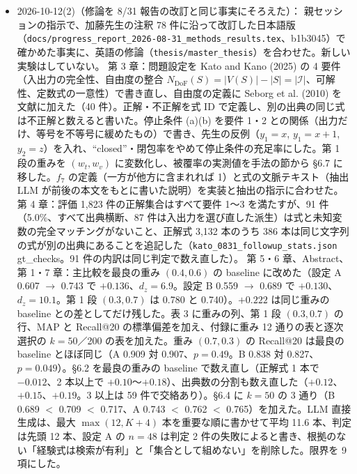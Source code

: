 \documentclass[11pt,a4paper]{jsarticle}
\begin{document}
\begin{itemize}[nosep]
    表 3 の提案手法の MAP を \texttt{kato\_0831\_followup\_stats.json} map\_standard の値に改めた（設定 A：重み $(0.7, 0.3)$ 0.796、$(0.3, 0.7)$ 0.850。設定 B：0.715、0.795）。\S 6.1 は「MAP でも最良の baseline を 10 分割すべてで上回る（A $+0.104$、B $+0.088$）」と書いた。
    baseline 側の確認：\texttt{external\_baselines.py --save-per-case} を scratch に出力して再実行し（学習なし・決定的。集計値は既存の JSON と全ラベルで完全一致）、正解式の順位を得た。順位 10,000 以上の正解式は文章だけの重み $(1.0, 0.0)$ だけ（A 176/17,420 本、B 101/13,468 本）で、ほかの行（BM25・E5 を含む）は両定義で MAP が同じ。付録の重み 12 通りの表では $(1.0, 0.0)$ の設定 A の MAP だけが 0.148 から 0.147 に変わった（B は 0.170 のまま）。図に MAP はない。
    ビルド：\texttt{latexmk -gg} exit 0、未定義参照 0、本文 1〜28 ページ。
  \item 2026-10-12(2)（修論を 8/31 報告の改訂と同じ事実にそろえた）：
    親セッションの指示で、加藤先生の注釈 78 件に沿って改訂した日本語版（\texttt{docs/progress\_report\_2026-08-31\_methods\_results.tex}、b1b3045）で確かめた事実に、英語の修論（\texttt{thesis/master\_thesis}）を合わせた。新しい実験はしていない。
    第 3 章：問題設定を Kato and Kano (2025) の 4 要件（入出力の完全性、自由度の整合 $N_{\mathrm{DoF}}(S)=|V(S)|-|S|=|\mathcal{I}|$、可解性、定数式の一意性）で書き直し、自由度の定義に Seborg et al. (2010) を文献に加えた（40 件）。正解・不正解を式 ID で定義し、別の出典の同じ式は不正解と数えると書いた。停止条件 (a)(b) を要件 1・2 との関係（出力だけ、等号を不等号に緩めたもの）で書き、先生の反例（$y_1=x$, $y_1=x+1$, $y_2=z$）を入れ、``closed''・閉包率をやめて停止条件の充足率にした。第 1 段の重みを $(w_t, w_v)$ に変数化し、被覆率の実測値を手法の節から \S 6.7 に移した。$f_7$ の定義（一方が他方に含まれれば 1）と式の文脈テキスト（抽出 LLM が前後の本文をもとに書いた説明）を実装と抽出の指示に合わせた。
    第 4 章：評価 1,823 件の正解集合はすべて要件 1〜3 を満たすが、91 件（5.0\%、すべて出典横断、87 件は入出力を選び直した派生）は式と未知変数の完全マッチングがないこと、正解式 3,132 本のうち 386 本は同じ文字列の式が別の出典にあることを追記した（\texttt{kato\_0831\_followup\_stats.json} gt\_checks。91 件の内訳は同じ判定で数え直した）。
    第 5・6 章、Abstract、第 1・7 章：主比較を最良の重み $(0.4, 0.6)$ の baseline に改めた（設定 A 0.607 $\to$ 0.743 で $+0.136$、$d_z = 6.9$。設定 B 0.559 $\to$ 0.689 で $+0.130$、$d_z = 10.1$。第 1 段 $(0.3, 0.7)$ は 0.780 と 0.740）。$+0.222$ は同じ重みの baseline との差としてだけ残した。表 3 に重みの列、第 1 段 $(0.3, 0.7)$ の行、MAP と Recall@20 の標準偏差を加え、付録に重み 12 通りの表と逐次選択の $k = 50$／200 の表を加えた。重み $(0.7, 0.3)$ の Recall@20 は最良の baseline とほぼ同じ（A 0.909 対 0.907、$p = 0.49$。B 0.838 対 0.827、$p = 0.049$）。\S 6.2 を最良の重みの baseline で数え直し（正解式 1 本で $-0.012$、2 本以上で $+0.10$〜$+0.18$）、出典数の分割も数え直した（$+0.12$、$+0.15$、$+0.19$。3 以上は 59 件で交絡あり）。\S 6.4 に $k = 50$ の 3 通り（B 0.689 $<$ 0.709 $<$ 0.717、A 0.743 $<$ 0.762 $<$ 0.765）を加えた。LLM 直接生成は、最大 $\max(12, K+4)$ 本を重要な順に書かせて平均 11.6 本、判定は先頭 12 本、設定 A の $n = 48$ は判定 2 件の失敗によると書き、根拠のない「経験式は検索が有利」と「集合として組めない」を削除した。限界を 9 項にした。

\end{itemize}
\end{document}
